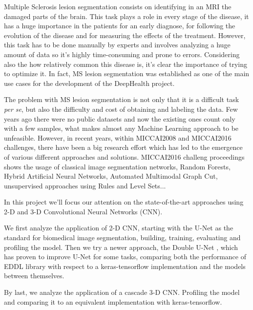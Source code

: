 Multiple Sclerosis lesion segmentation consists on identifying in an MRI the damaged parts of the brain. This task plays a role in every stage of the disease, it has a huge importance in the patients for an early diagnose, for following the evolution of the disease and for measuring the effects of the treatment. However, this task has to be done manually by experts and involves analyzing a huge amount of data so it's highly time-consuming and prone to errors. Considering also the how relatively common this disease is, it's clear the importance of trying to optimize it. In fact, MS lesion segmentation was established as one of the main use cases for the development of the DeepHealth project. 

The problem with MS lesion segmentation is not only that it is a difficult task \textit{per se}, but also the difficulty and cost of obtaining and labeling the data. Few years ago there were no public datasets and now the existing ones count only  with a few samples, what makes almost any Machine Learning approach to be unfeasible. However, in recent years, within MICCAI2008 and MICCAI2016 challenges, there have been a big research effort which has led to the emergence of various different approaches and solutions. MICCAI2016 challeng proceedings \cite{MICCAI_MSSEG:2016} shows the usage of classical image segmentation networks, Random Forests, Hybrid Artificial Neural Networks, Automated Multimodal Graph Cut, unsupervised approaches using Rules and Level Sets... 

In this project we'll focus our attention on the state-of-the-art approaches using 2-D and 3-D Convolutional Neural Networks (CNN). 

We first analyze the application of 2-D CNN, starting with the U-Net \cite{UNET:2015} as the standard for biomedical image segmentation, building, training, evaluating and profiling the model. Then we try a newer approach, the Double U-Net \cite{DOUBLE_UNET:2020}, which has proven to improve U-Net for some tasks, comparing both the performance of EDDL library with respect to a keras-tensorflow implementation and the models between themselves.

By last, we analyze the application of a cascade 3-D CNN. Profiling the model and comparing it to an equivalent implementation with keras-tensorflow.
